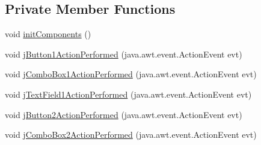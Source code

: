 \subsection*{Private Member Functions}
\begin{DoxyCompactItemize}
\item 
void \mbox{\hyperlink{classejercicio2_1_1_automovil_interfaz_a46fc96f0ec043a4e5c1d0fe2097e6d22}{init\+Components}} ()
\item 
void \mbox{\hyperlink{classejercicio2_1_1_automovil_interfaz_a48ab723d1cfb8e8d2bbbf13da2bbf276}{j\+Button1\+Action\+Performed}} (java.\+awt.\+event.\+Action\+Event evt)
\item 
void \mbox{\hyperlink{classejercicio2_1_1_automovil_interfaz_a250dab0b1f55b81b783a0a0862891584}{j\+Combo\+Box1\+Action\+Performed}} (java.\+awt.\+event.\+Action\+Event evt)
\item 
void \mbox{\hyperlink{classejercicio2_1_1_automovil_interfaz_adb96511f1a6c95b416fd5a73c235d1de}{j\+Text\+Field1\+Action\+Performed}} (java.\+awt.\+event.\+Action\+Event evt)
\item 
void \mbox{\hyperlink{classejercicio2_1_1_automovil_interfaz_a3629812b4c3141b32100171144e84be5}{j\+Button2\+Action\+Performed}} (java.\+awt.\+event.\+Action\+Event evt)
\item 
void \mbox{\hyperlink{classejercicio2_1_1_automovil_interfaz_abe380cd2d77594984defa61f7adcbae2}{j\+Combo\+Box2\+Action\+Performed}} (java.\+awt.\+event.\+Action\+Event evt)
\end{DoxyCompactItemize}
